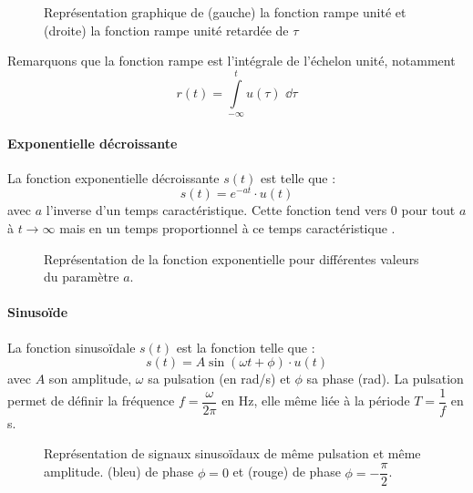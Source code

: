 \begin{figure}[!h]
\begin{center}

\end{center}
    \caption{Représentation graphique de (gauche) la fonction rampe unité et (droite) la fonction
        rampe unité retardée de $\tau$\label{fig-rampe}}
\end{figure}
Remarquons que la fonction rampe est l'intégrale de l'échelon unité, notamment 
$$
r(t)=\int\limits_{-\infty}^{t} u(\tau)\,\,\dd{\tau}
$$

\paragraph{Exponentielle décroissante}
La fonction exponentielle décroissante $s(t)$ est telle que :
$$
s(t)=e^{-at}\cdot u(t)
$$  
avec $a$ l'inverse d'un temps caractéristique. Cette fonction tend vers 0 pour 
tout $a$ à $t\rightarrow\infty$ mais en un temps proportionnel à ce temps caractéristique . 
\begin{figure}[!h]
\begin{center}

\end{center}
    \caption{Représentation de la fonction exponentielle pour différentes valeurs du paramètre $a$. \label{fig-exp}}
\end{figure}

\paragraph{Sinuso\"ide}
La fonction sinuso\"idale $s(t)$ est la fonction telle que :
$$
s(t)=A\sin{(\omega t +\phi)}\cdot u(t)
$$
avec $A$ son amplitude, $\omega$ sa pulsation (en rad/s) et $\phi$ sa phase (rad).
La pulsation permet de définir la fréquence $f=\dfrac{\omega}{2\pi}$ en \si{\hertz},  
elle même liée à la période $T=\dfrac{1}{f}$ en \si{\second}.
\begin{figure}[!h]
\begin{center}

\end{center}
    \caption{Représentation de signaux sinuso\"idaux de même pulsation et même amplitude. 
    (bleu) de phase $\phi=0$ et (rouge) de phase $\phi=-\dfrac{\pi}{2}$.\label{fig-sin}}
\end{figure}


